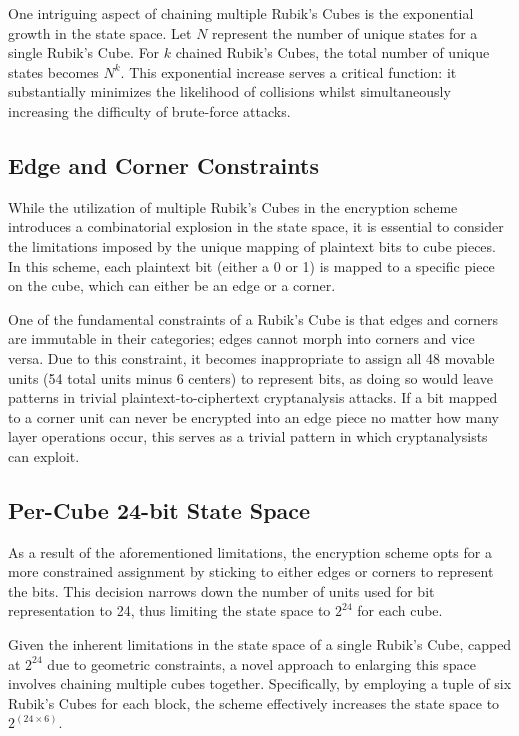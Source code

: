 \documentclass[12pt]{article}
\begin{document}
One intriguing aspect of chaining multiple Rubik's Cubes is the exponential growth in the state space. Let \( N \) represent the number of unique states for a single Rubik's Cube. For \( k \) chained Rubik's Cubes, the total number of unique states becomes \( N^k \). This exponential increase serves a critical function: it substantially minimizes the likelihood of collisions whilst simultaneously increasing the difficulty of brute-force attacks.

\subsection{Edge and Corner Constraints}

While the utilization of multiple Rubik's Cubes in the encryption scheme introduces a combinatorial explosion in the state space, it is essential to consider the limitations imposed by the unique mapping of plaintext bits to cube pieces. In this scheme, each plaintext bit (either a 0 or 1) is mapped to a specific piece on the cube, which can either be an edge or a corner.

One of the fundamental constraints of a Rubik's Cube is that edges and corners are immutable in their categories; edges cannot morph into corners and vice versa. Due to this constraint, it becomes inappropriate to assign all 48 movable units (54 total units minus 6 centers) to represent bits, as doing so would leave patterns in trivial plaintext-to-ciphertext cryptanalysis attacks. If a bit mapped to a corner unit can never be encrypted into an edge piece no matter how many layer operations occur, this serves as a trivial pattern in which cryptanalysists can exploit.

\subsection{Per-Cube 24-bit State Space}
As a result of the aforementioned limitations, the encryption scheme opts for a more constrained assignment by sticking to either edges or corners to represent the bits. This decision narrows down the number of units used for bit representation to 24, thus limiting the state space to \(2^{24}\) for each cube.

Given the inherent limitations in the state space of a single Rubik's Cube, capped at \(2^{24}\) due to geometric constraints, a novel approach to enlarging this space involves chaining multiple cubes together. Specifically, by employing a tuple of six Rubik's Cubes for each block, the scheme effectively increases the state space to \(2^{(24 \times 6)}\).
\end{document}
